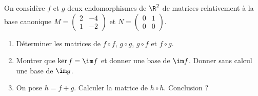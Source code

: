 \documentclass[a4paper, 11pt,reqno]{article}
\begin{document}
\begin{exercice}  \;
	On consid\`ere $f$ et $g$ deux endomorphismes de $\R^2$ de matrices relativement \`a la base canonique $M=\left(\begin{array}{ll} 2&-4\\1&-2 \end{array}\right)$ et
	$N=\left(\begin{array}{ll} 0&1\\0&0 \end{array}\right)$.
	\begin{enumerate}
		\item D\'eterminer les matrices de $f\circ f$, $g\circ g$, $g\circ f$ et $f\circ g$.
		\item Montrer que $\ker f=\im f$ et donner une base de $\im f$. Donner sans calcul une base de $\im g$.
		\item On pose $h=f+g$. Calculer la matrice de $h\circ h$. Conclusion ?
	\end{enumerate}
\end{exercice}
\end{document}
